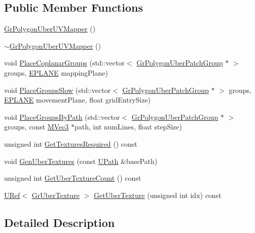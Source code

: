 \begin{CompactItemize}
\subsection*{Public Member Functions}
\begin{CompactItemize}
\item 
\hyperlink{class_gr_polygon_uber_u_v_mapper_62445ba98a0326933278328d68aced62}{GrPolygonUberUVMapper} ()
\item 
\hyperlink{class_gr_polygon_uber_u_v_mapper_64f19e9773d0da6f67365c2ec30ee345}{$\sim$GrPolygonUberUVMapper} ()
\item 
void \hyperlink{class_gr_polygon_uber_u_v_mapper_fa0335ced5f8d354def36aceac076856}{PlaceCoplanarGroups} (std::vector$<$ \hyperlink{class_gr_polygon_uber_patch_group}{GrPolygonUberPatchGroup} $\ast$ $>$ groups, \hyperlink{class_gr_polygon_uber_u_v_mapper_a69a4db116a89f2e1d789954220ee4ac}{EPLANE} mappingPlane)
\item 
void \hyperlink{class_gr_polygon_uber_u_v_mapper_ba7a0c7dc52e9109bf8f55e9e447a7a8}{PlaceGroupsSlow} (std::vector$<$ \hyperlink{class_gr_polygon_uber_patch_group}{GrPolygonUberPatchGroup} $\ast$ $>$ groups, \hyperlink{class_gr_polygon_uber_u_v_mapper_a69a4db116a89f2e1d789954220ee4ac}{EPLANE} movementPlane, float gridEntrySize)
\item 
void \hyperlink{class_gr_polygon_uber_u_v_mapper_0562d503abc18609adbfcd5634ac1d67}{PlaceGroupsByPath} (std::vector$<$ \hyperlink{class_gr_polygon_uber_patch_group}{GrPolygonUberPatchGroup} $\ast$ $>$ groups, const \hyperlink{class_m_vec3}{MVec3} $\ast$path, int numLines, float stepSize)
\item 
unsigned int \hyperlink{class_gr_polygon_uber_u_v_mapper_1b1c2e827d9afdf7256660cd3059181b}{GetTexturesRequired} () const 
\item 
void \hyperlink{class_gr_polygon_uber_u_v_mapper_d602be70fe9a07805413c93844ff42c8}{GenUberTextures} (const \hyperlink{class_u_path}{UPath} \&basePath)
\item 
unsigned int \hyperlink{class_gr_polygon_uber_u_v_mapper_20d074282fcd83d769fdb08d13d410a2}{GetUberTextureCount} () const 
\item 
\hyperlink{class_u_ref}{URef}$<$ \hyperlink{class_gr_uber_texture}{GrUberTexture} $>$ \hyperlink{class_gr_polygon_uber_u_v_mapper_053a382364662fe61fdc108fd98d9adb}{GetUberTexture} (unsigned int idx) const 
\end{CompactItemize}


\subsection{Detailed Description}



\end{CompactItemize}

